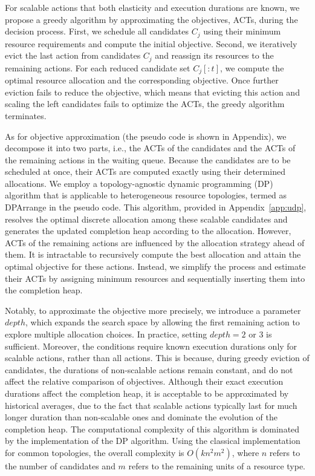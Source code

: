 
For scalable actions that both elasticity and execution durations are known, we propose a greedy algorithm by approximating the objectives, ACTs, during the decision process. First, we schedule all candidates $C_j$ using their minimum resource requirements and compute the initial objective.
Second, we iteratively evict the last action from candidates $C_j$ and reassign its resources to the remaining actions. For each reduced candidate set $C_j[:t]$, we compute the optimal resource allocation and the corresponding objective. Once further eviction fails to reduce the objective, which means that evicting this action and scaling the left candidates fails to optimize the ACTs, the greedy algorithm terminates. 

As for objective approximation (the pseudo code is shown in Appendix), we decompose it into two parts, i.e., the ACTs of the candidates and the ACTs of the remaining actions in the waiting queue. Because the candidates are to be scheduled at once, their ACTs are computed exactly using their determined allocations. We employ a topology-agnostic dynamic programming (DP) algorithm that is applicable to heterogeneous resource topologies, termed as DPArrange in the pseudo code. This algorithm, provided in Appendix~\ref{app:udp}, resolves the optimal discrete allocation among these scalable candidates and generates the updated completion heap according to the allocation.
However, ACTs of the remaining actions are influenced by the allocation strategy ahead of them. It is intractable to recursively compute the best allocation and attain the optimal objective for these actions. Instead, we simplify the process and estimate their ACTs by assigning minimum resources and sequentially inserting them into the completion heap.

Notably, to approximate the objective more precisely, we introduce a parameter $depth$, which expands the search space by allowing the first remaining action to explore multiple allocation choices. In practice, setting $depth=2$ or $3$ is sufficient. Moreover, the conditions require known execution durations only for scalable actions, rather than all actions. This is because, during greedy eviction of candidates, the durations of non-scalable actions remain constant, and do not affect the relative comparison of objectives.
Although their exact execution durations affect the completion heap, it is acceptable to be approximated by historical averages, due to the fact that scalable actions typically last for much longer duration than non-scalable ones and dominate the evolution of the completion heap. The computational complexity of this algorithm is dominated by the implementation of the DP algorithm. Using the classical implementation for common topologies, the overall complexity is $O(kn^2m^2)$, where $n$ refers to the number of candidates and $m$ refers to the remaining units of a resource type.


